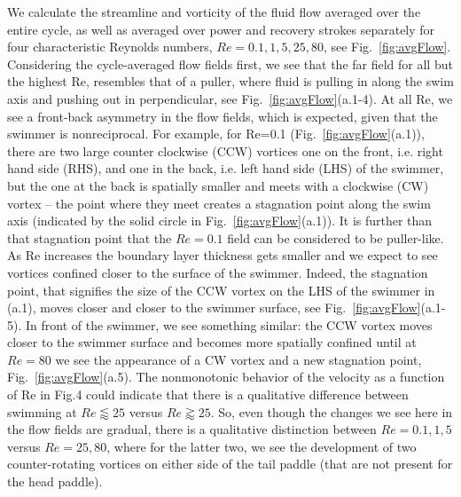\documentclass[%
 onecolumn,
superscriptaddress,
 amsmath,amssymb,
 aps,
longbibliography
]{revtex4-2}
\begin{document}
We calculate the streamline and vorticity of the fluid flow averaged over the entire cycle, as well as averaged over power and recovery strokes separately for four characteristic Reynolds numbers, $Re=0.1, 1, 5, 25, 80$, see Fig.~\ref{fig:avgFlow}. Considering the cycle-averaged flow fields first, we see that the far field for all but the highest Re, resembles that of a puller, where fluid is pulling in along the swim axis and pushing out in perpendicular, see Fig.~\ref{fig:avgFlow}(a.1-4). At all Re, we see a front-back asymmetry in the flow fields, which is expected, given that the swimmer is nonreciprocal. For example, for Re=0.1 (Fig.~\ref{fig:avgFlow}(a.1)), there are two large counter clockwise (CCW) vortices one on the front, i.e. right hand side (RHS), and one in the back, i.e. left hand side (LHS) of the swimmer, but the one at the back is spatially smaller and meets with a clockwise (CW) vortex -- the point where they meet creates a stagnation point along the swim axis (indicated by the solid circle in Fig.~\ref{fig:avgFlow}(a.1)). It is further than that stagnation point that the $Re=0.1$ field can be considered to be puller-like. As Re increases the boundary layer thickness gets smaller and we expect to see vortices confined closer to the surface of the swimmer. Indeed, the stagnation point, that signifies the size of the CCW vortex on the LHS of the swimmer in (a.1), moves closer and closer to the swimmer surface, see Fig.~\ref{fig:avgFlow}(a.1-5). In front of the swimmer, we see something similar: the CCW vortex moves closer to the swimmer surface and becomes more spatially confined until at $Re=80$ we see the appearance of a CW vortex and a new stagnation
point, Fig.~\ref{fig:avgFlow}(a.5). The nonmonotonic behavior of the velocity as a function of Re in Fig.4 could indicate that there is a qualitative difference between swimming at $Re\lessapprox25$ versus $Re\gtrapprox25$. So, even though the changes we see here in the flow fields are gradual, there is a qualitative distinction between $Re=0.1, 1, 5$ versus $Re=25, 80$, where for the latter two, we see the development of two counter-rotating vortices on either side of the tail paddle (that are not present for the head paddle). 
\end{document}
